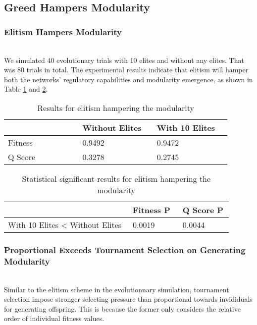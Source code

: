 \subsection{Greed Hampers Modularity}

\subsubsection{Elitism Hampers Modularity}~\\
We simulated 40 evolutionary trials with 10 elites and without any elites. That was 80 trials in total. The experimental results indicate that elitism will hamper both the networks' regulatory capabilities and modularity emergence, as shown in Table \ref{table:4.8} and \ref{table:4.9}.

\begin{table}[h]
	\centering
	\caption{Results for elitism hampering the modularity}
	\label{table:4.8}
	\begin{tabular}{| p{0.3\linewidth}  | p{0.3\linewidth}  | p{0.3\linewidth} |} 
		\hline
		& Without Elites & With 10 Elites \\
		\hline
		Fitness & 0.9492 & 0.9472 \\ 
		\hline
		Q Score & 0.3278 & 0.2745 \\
		\hline
	\end{tabular}
\end{table}

\begin{table}[h]
	\centering
	\caption{Statistical significant results for elitism hampering the modularity}
	\label{table:4.9}
	\begin{tabular}{| p{0.5\linewidth}  | p{0.2\linewidth}  | p{0.2\linewidth}  |} 
		\hline
		& Fitness P & Q Score P \\
		\hline
		With 10 Elites < Without Elites & 0.0019 & 0.0044 \\ 
		\hline
	\end{tabular}
\end{table}

\subsubsection{Proportional Exceeds Tournament Selection on Generating Modularity}~\\
Similar to the elitism scheme in the evolutionnary simulation, tournament selection impose stronger selecting pressure than proportional towards invididuals for generating offspring. This is because the former only considers the relative order of individual fitness values. 

